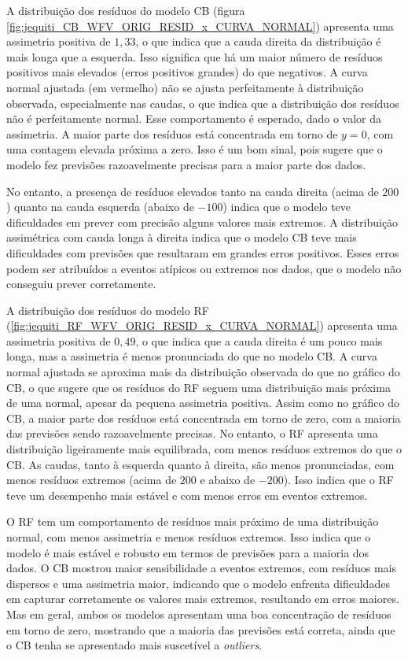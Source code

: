 A distribuição dos resíduos do modelo CB (figura \ref{fig:jequiti_CB_WFV_ORIG_RESID_x_CURVA_NORMAL}) apresenta uma assimetria positiva de $1,33$, o que indica que a cauda direita da distribuição é mais longa que a esquerda. Isso significa que há um maior número de resíduos positivos mais elevados (erros positivos grandes) do que negativos. A curva normal ajustada (em vermelho) não se ajusta perfeitamente à distribuição observada, especialmente nas caudas, o que indica que a distribuição dos resíduos não é perfeitamente normal. Esse comportamento é esperado, dado o valor da assimetria. A maior parte dos resíduos está concentrada em torno de $y=0$, com uma contagem elevada próxima a zero. Isso é um bom sinal, pois sugere que o modelo fez previsões razoavelmente precisas para a maior parte dos dados.

No entanto, a presença de resíduos elevados tanto na cauda direita (acima de $200$) quanto na cauda esquerda (abaixo de $-100$) indica que o modelo teve dificuldades em prever com precisão alguns valores mais extremos. A distribuição assimétrica com cauda longa à direita indica que o modelo CB teve mais dificuldades com previsões que resultaram em grandes erros positivos. Esses erros podem ser atribuídos a eventos atípicos ou extremos nos dados, que o modelo não conseguiu prever corretamente.

A distribuição dos resíduos do modelo RF (\ref{fig:jequiti_RF_WFV_ORIG_RESID_x_CURVA_NORMAL}) apresenta uma assimetria positiva de $0,49$, o que indica que a cauda direita é um pouco mais longa, mas a assimetria é menos pronunciada do que no modelo CB. A curva normal ajustada se aproxima mais da distribuição observada do que no gráfico do CB, o que sugere que os resíduos do RF seguem uma distribuição mais próxima de uma normal, apesar da pequena assimetria positiva. Assim como no gráfico do CB, a maior parte dos resíduos está concentrada em torno de zero, com a maioria das previsões sendo razoavelmente precisas. No entanto, o RF apresenta uma distribuição ligeiramente mais equilibrada, com menos resíduos extremos do que o CB. As caudas, tanto à esquerda quanto à direita, são menos pronunciadas, com menos resíduos extremos (acima de $200$ e abaixo de $-200$). Isso indica que o RF teve um desempenho mais estável e com menos erros em eventos extremos.

O RF tem um comportamento de resíduos mais próximo de uma distribuição normal, com menos assimetria e menos resíduos extremos. Isso indica que o modelo é mais estável e robusto em termos de previsões para a maioria dos dados. O CB mostrou maior sensibilidade a eventos extremos, com resíduos mais dispersos e uma assimetria maior, indicando que o modelo enfrenta dificuldades em capturar corretamente os valores mais extremos, resultando em erros maiores. Mas em geral, ambos os modelos apresentam uma boa concentração de resíduos em torno de zero, mostrando que a maioria das previsões está correta, ainda que o CB tenha se apresentado mais suscetível a \textit{outliers}.

